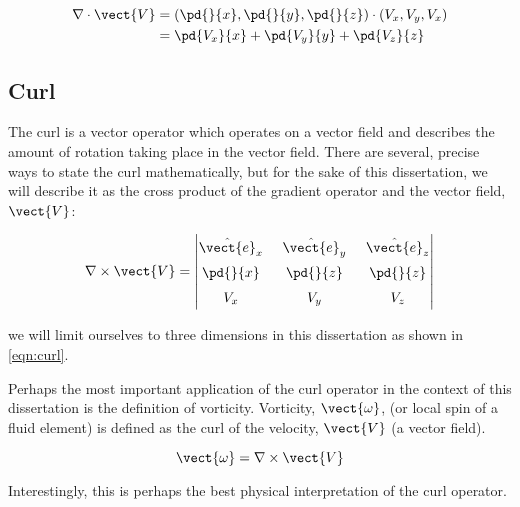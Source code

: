 \begin{equation}
    \label{eqn:divergence}
    \begin{aligned}
        \nabla \cdot \vect{V} &= \left(\pd{}{x}, \pd{}{y}, \pd{}{z}\right) \cdot \left( V_x, V_y, V_x \right) \\
                              &= \pd{V_x}{x} + \pd{V_y}{y} + \pd{V_z}{z}
    \end{aligned}
\end{equation}

\subsection{Curl}

The curl is a vector operator which operates on a vector field and describes the amount of rotation taking place in the vector field.
%
There are several, precise ways to state the curl mathematically, but for the sake of this dissertation, we will describe it as the cross product of the gradient operator and the vector field, \(\vect{V}\):

\begin{equation}
    \label{eqn:curl}
    \begingroup
    \renewcommand*{\arraystretch}{1.5}
    \setlength{\arraycolsep}{7pt}
    \nabla \times \vect{V} =
    \begin{vmatrix}
        \hat{\vect{e}}_x & \hat{\vect{e}}_y & \hat{\vect{e}}_z \\
        \pd{}{x} & \pd{}{z} & \pd{}{z} \\
        V_x & V_y & V_z
    \end{vmatrix}
    \endgroup
\end{equation}

\where we will limit ourselves to three dimensions in this dissertation as shown in \cref{eqn:curl}.

Perhaps the most important application of the curl operator in the context of this dissertation is the definition of vorticity.
Vorticity, \(\vect{\omega}\), (or local spin of a fluid element) is defined as the curl of the velocity, \(\vect{V}\) (a vector field).

\begin{equation}
    \label{eqn:vorticitydef}
	\vect{\omega} = \nabla \times \vect{V}
\end{equation}

\noindent Interestingly, this is perhaps the best physical interpretation of the curl operator.


